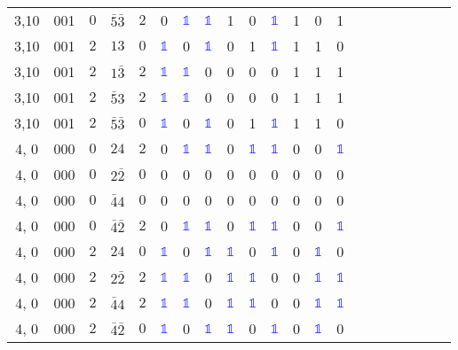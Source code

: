 \begin{longtable*}{c| cccccccccccccccccccc }
3,10& 001& $0$& $\bar{5}\bar{3}$& $2$& 0& \textcolor{blue}{$\mathds{1}$}& \textcolor{blue}{$\mathds{1}$}& 1& 0& \textcolor{blue}{$\mathds{1}$}& 1& 0& 1\\
3,10& 001& $2$& $13$& $0$& \textcolor{blue}{$\mathds{1}$}& 0& \textcolor{blue}{$\mathds{1}$}& 0& 1& \textcolor{blue}{$\mathds{1}$}& 1& 1& 0\\
3,10& 001& $2$& $1\bar{3}$& $2$& \textcolor{blue}{$\mathds{1}$}& \textcolor{blue}{$\mathds{1}$}& 0& 0& 0& 0& 1& 1& 1\\
3,10& 001& $2$& $\bar{5}3$& $2$& \textcolor{blue}{$\mathds{1}$}& \textcolor{blue}{$\mathds{1}$}& 0& 0& 0& 0& 1& 1& 1\\
3,10& 001& $2$& $\bar{5}\bar{3}$& $0$& \textcolor{blue}{$\mathds{1}$}& 0& \textcolor{blue}{$\mathds{1}$}& 0& 1& \textcolor{blue}{$\mathds{1}$}& 1& 1& 0\\
4, 0& 000& $0$& $24$& $2$& 0& \textcolor{blue}{$\mathds{1}$}& \textcolor{blue}{$\mathds{1}$}& 0& \textcolor{blue}{$\mathds{1}$}& \textcolor{blue}{$\mathds{1}$}& 0& 0& \textcolor{blue}{$\mathds{1}$}\\
4, 0& 000& $0$& $2\bar{2}$& $0$& 0& 0& 0& 0& 0& 0& 0& 0& 0\\
4, 0& 000& $0$& $\bar{4}4$& $0$& 0& 0& 0& 0& 0& 0& 0& 0& 0\\
4, 0& 000& $0$& $\bar{4}\bar{2}$& $2$& 0& \textcolor{blue}{$\mathds{1}$}& \textcolor{blue}{$\mathds{1}$}& 0& \textcolor{blue}{$\mathds{1}$}& \textcolor{blue}{$\mathds{1}$}& 0& 0& \textcolor{blue}{$\mathds{1}$}\\
4, 0& 000& $2$& $24$& $0$& \textcolor{blue}{$\mathds{1}$}& 0& \textcolor{blue}{$\mathds{1}$}& \textcolor{blue}{$\mathds{1}$}& 0& \textcolor{blue}{$\mathds{1}$}& 0& \textcolor{blue}{$\mathds{1}$}& 0\\
4, 0& 000& $2$& $2\bar{2}$& $2$& \textcolor{blue}{$\mathds{1}$}& \textcolor{blue}{$\mathds{1}$}& 0& \textcolor{blue}{$\mathds{1}$}& \textcolor{blue}{$\mathds{1}$}& 0& 0& \textcolor{blue}{$\mathds{1}$}& \textcolor{blue}{$\mathds{1}$}\\
4, 0& 000& $2$& $\bar{4}4$& $2$& \textcolor{blue}{$\mathds{1}$}& \textcolor{blue}{$\mathds{1}$}& 0& \textcolor{blue}{$\mathds{1}$}& \textcolor{blue}{$\mathds{1}$}& 0& 0& \textcolor{blue}{$\mathds{1}$}& \textcolor{blue}{$\mathds{1}$}\\
4, 0& 000& $2$& $\bar{4}\bar{2}$& $0$& \textcolor{blue}{$\mathds{1}$}& 0& \textcolor{blue}{$\mathds{1}$}& \textcolor{blue}{$\mathds{1}$}& 0& \textcolor{blue}{$\mathds{1}$}& 0& \textcolor{blue}{$\mathds{1}$}& 0\\

\end{longtable*}
